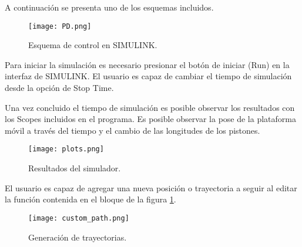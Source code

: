 A continuación se presenta uno de los esquemas incluidos.

\begin{figure}[htb!]
\centering
 \texttt{[image: PD.png]}
 \caption{Esquema de control en SIMULINK.}
\end{figure}

Para iniciar la simulación es necesario 
presionar el botón de iniciar (Run) 
en la interfaz de SIMULINK.
El usuario es capaz de cambiar el tiempo de 
simulación desde la opción de Stop Time.

Una vez concluido el tiempo de simulación es 
posible observar los resultados con los 
Scopes incluidos en el programa.
Es posible observar la pose de la plataforma móvil
a través del tiempo y el cambio de las longitudes de los pistones.

\begin{figure}[htb!]
 \centering
 \texttt{[image: plots.png]}
 \caption{Resultados del simulador.}
\end{figure}

El usuario es capaz de agregar una nueva posición o
trayectoria a seguir al editar la función contenida en 
el bloque de la figura \ref{fig: custom path}.

\begin{figure}[htb!]
 \centering
 \texttt{[image: custom\_path.png]}
 \caption{Generación de trayectorias.}
 \label{fig: custom path}
\end{figure}




